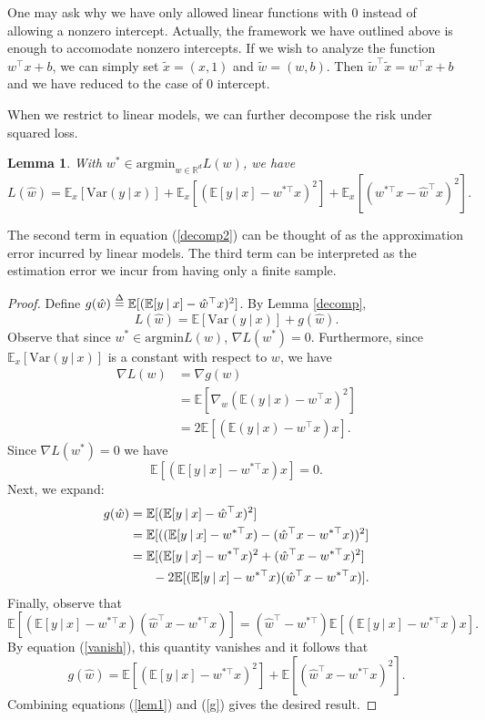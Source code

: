 \documentclass[11pt]{article}
\newcommand\defn{\stackrel{\mathclap{\tiny\Delta}}{=}}
\newcommand\E{\mathbb{E}}
\newcommand\Var{\mathrm{Var}}
\newtheorem{lemma}[theorem]{Lemma}
\begin{document}
One may ask why we have only allowed linear functions with $0$ instead of allowing a nonzero intercept. Actually, the framework we have outlined above is enough to accomodate nonzero intercepts. If we wish to analyze the function $w^\top x + b$, we can simply set $\tilde{x} = (x,1)$ and $\tilde{w} = (w,b)$. Then $\tilde{w}^\top \tilde{x} = w^\top x + b$ and we have reduced to the case of $0$ intercept.

When we restrict to linear models, we can further decompose the risk under squared loss.
\begin{lemma} \label{lin}
With $w^*\in \mathrm{argmin}_{w\in \mathbb{R}^d}L(w)$, we have \begin{equation}\label{decomp2}L(\hat{w}) = \E_x [\Var(y \: | \: x)] + \E_x[(\E[y\: | \: x]-w^{*\top} x)^2] + \E_x[(w^{*\top} x-\hat{w}^\top x)^2].\end{equation}
\end{lemma}
The second term in equation (\ref{decomp2}) can be thought of as the approximation error incurred by linear models. The third term can be interpreted as the estimation error we incur from having only a finite sample.
\begin{proof}
Define $g(\hat{w}) \defn \E[(\E[y\: | \: x]-\hat{w}^\top x)^2]$. By Lemma \ref{decomp}, \begin{equation}\label{lem1}L(\hat{w}) = \E[\Var(y\: | \: x)] + g(\hat{w}).\end{equation} Observe that since $w^*\in \mathrm{argmin} L(w)$, $\nabla L(w^*)=0$. Furthermore, since $\E_x[\Var(y\: | \: x)]$ is a constant with respect to $w$, we have
\begin{align*}
    \nabla L(w) &= \nabla g(w) \\
    &= \E[\nabla_w(\E(y\: | \: x) -w^\top x)^2] \\
    &= 2\E[(\E(y\: | \: x) - w^\top x)x].
\end{align*}
Since $\nabla L(w^*)=0$ we have \begin{equation}\label{vanish}\E[(\E[y \: | \: x]-w^{*\top}x)x]=0.\end{equation} Next, we expand:
\begin{align*}
    g(\hat{w}) &= \E[(\E[y\: | \: x]-\hat{w}^\top x)^2] \\
    &= \E[((\E[y\: | \:x]-w^{*\top}x)-(\hat{w}^\top x-w^{*\top}x))^2] \\
    &=\E[(\E[y\: | \: x] - w^{*\top}x)^2 + (\hat{w}^\top x - w^{*\top}x)^2] \\
    &\hspace{.25in} -2\E[(\E[y \: | \: x] - w^{*\top}x)(\hat{w}^\top x-w^{*\top}x)].
\end{align*}
Finally, observe that $$\E[(\E[y\: | \:x] - w^{*\top}x)(\hat{w}^\top x - w^{*\top}x)] = (\hat{w}^\top - w^{*\top})\E[(\E[y\:|\:x]-w^{*\top}x)x].$$ By equation (\ref{vanish}), this quantity vanishes and it follows that
\begin{equation}\label{g}g(\hat{w}) = \E[(\E[y\: | \: x] - w^{*\top}x)^2] + \E[(\hat{w}^\top x - w^{*\top}x)^2].\end{equation} Combining equations (\ref{lem1}) and (\ref{g}) gives the desired result. 
\end{proof}
\end{document}
